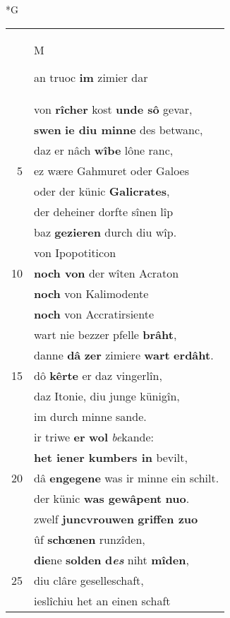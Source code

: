 \documentclass[8pt,a4paper,notitlepage]{article}
\begin{document}
\newpage
\begin{table}[ht]
\begin{minipage}[t]{0.5\linewidth}
\small
\begin{center}*G
\end{center}
\begin{tabular}{rl}
 & \begin{large}M\end{large}an truoc \textbf{im} zimier dar\\ 
 & von \textbf{rîcher} kost \textbf{unde sô} gevar,\\ 
 & \textbf{swen} \textbf{ie diu minne} des betwanc,\\ 
 & daz er nâch \textbf{wîbe} lône ranc,\\ 
5 & ez wære Gahmuret oder Galoes\\ 
 & oder der künic \textbf{Galicrates},\\ 
 & der deheiner dorfte sînen lîp\\ 
 & baz \textbf{gezieren} durch diu wîp.\\ 
 & von Ipopotiticon\\ 
10 & \textbf{noch von} der wîten Acraton\\ 
 & \textbf{noch} von Kalimodente\\ 
 & \textbf{noch} von Accratirsiente\\ 
 & wart nie bezzer pfelle \textbf{brâht},\\ 
 & danne \textbf{dâ} \textbf{zer} zimiere \textbf{wart} \textbf{erdâht}.\\ 
15 & dô \textbf{kêrte} er daz vingerlîn,\\ 
 & daz Itonie, diu junge künigîn,\\ 
 & im durch minne sande.\\ 
 & ir triwe \textbf{er} \textbf{wol} \textit{be}kande:\\ 
 & \textbf{het iener kumbers in} bevilt,\\ 
20 & dâ \textbf{engegene} was ir minne ein schilt.\\ 
 & der künic \textbf{was gewâpent} \textbf{nuo}.\\ 
 & zwelf \textbf{juncvrouwen} \textbf{griffen zuo}\\ 
 & ûf \textbf{schœnen} runzîden,\\ 
 & \textbf{die}ne \textbf{solden} \textbf{d\textit{es}} niht \textbf{mîden},\\ 
25 & diu clâre geselleschaft,\\ 
 & ieslîchiu het an einen schaft\\ 

\end{tabular}
\end{minipage}
\end{table}
\end{document}

